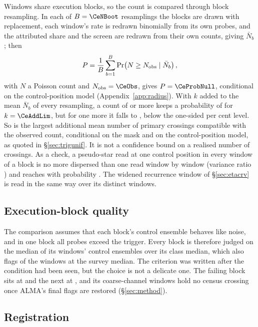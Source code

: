 Windows share execution blocks, so the count is compared through block
resampling. In each of $B=\CeNBoot$ resamplings the blocks are drawn with
replacement, each window's rate is redrawn binomially from its own probes,
and the attributed share and the screen are redrawn from their own counts,
giving $\bar N_b$; then
\begin{equation*}
P=\frac{1}{B}\sum_{b=1}^{B}\Pr\!\left(N\ge N_{\rm obs}\mid\bar N_b\right),
\end{equation*}
with $N$ a Poisson count and $N_{\rm obs}=\CeObs$, gives $P=\CeProbNull$,
conditional on the control-position model (Appendix~\ref{app:radius}). With
$k$ added to the mean $\bar N_b$ of every resampling, a count of \CeObs{} or
more keeps a probability of \CeProbAtLim{} for $k=\CeAddLim$, but for one
more it falls to \CeProbAboveLim, below the one-sided \CeAlphaPct{} per cent
level. So \CeAddLim{} is the largest additional mean number of primary crossings
compatible with the observed count, conditional on the mask and on the
control-position model, as quoted in \S\ref{sec:trigunif}. It is not a
confidence bound on a realised number of crossings. As a check, a pseudo-star read at one control position in every window of
a block is no more dispersed than one read window by window (variance ratio
\BgDisp) and reaches \CeObs{} with probability \BgPseudoP. The widened recurrence window
of \S\ref{sec:etacrv} is read in the same way over its \WuNWin{} distinct
windows.

\subsection{Execution-block quality}
\label{sec:blockquality}

The comparison assumes that each block's control ensemble behaves like
noise, and in one block all \NCtrl{} probes exceed the trigger. Every block
is therefore judged on the median of its windows' control ensembles over its
class median, which also flags \DqNWin{} of the \NWindows{} windows at
\BqFactor{} the survey median. The criterion was written after the condition
had been seen, but the choice is not a delicate one. The failing block sits
at \BqFailQ{} and the next at \BqNextQ, and its \BqFailNWin{} coarse-channel
windows hold no census crossing once ALMA's final flags are restored
(\S\ref{sec:method}).

\subsection{Registration}
\label{sec:regbudget}

